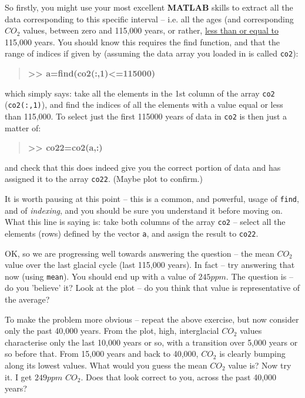 \documentclass{tufte-book} %
\newenvironment{docspecbold}{\begin{quotation}\ttfamily\bfseries\parskip0pt\parindent0pt\ignorespaces}{\end{quotation}}
\begin{document}
So firstly, you might use your most excellent \textbf{MATLAB} skills to extract all the data corresponding to this specific interval -- i.e. all the ages (and corresponding \(CO_{2}\) values, between zero and 115,000 years, or rather, \uline{less than or equal to} 115,000 years. You should know this requires the find function, and that the range of indices if given by (assuming the data array you loaded in is called \texttt{co2}):
\begin{docspecbold}
>> a=find(co2(:,1)<=115000)
\end{docspecbold}
which simply says: take all the elements in the 1st column of the array \texttt{co2} (\texttt{co2(:,1)}), and find the indices of all the elements with a value equal or less than 115,000. To select just the first 115000 years of data in \texttt{co2} is then just a matter of: 
\begin{docspecbold}
>> co22=co2(a,:)
\end{docspecbold}
and check that this does indeed give you the correct portion of data and has assigned it to the array \texttt{co22}.
(Maybe plot to confirm.)

It is worth pausing at this point -- this is a common, and powerful, usage of \texttt{find}, and of \textit{indexing}, and you should be sure you understand it before moving on. What this line is saying is: take both columns of the array \texttt{co2} -- select all the elements (rows) defined by the vector \texttt{a}, and assign the result to \texttt{co22}.

OK, so we are progressing well towards answering the question -- the mean \(CO_{2}\) value over the last glacial cycle (last 115,000 years). In fact -- try answering that now (using \texttt{mean}). You should end up with a value of \(245 ppm\). The question is -- do you 'believe' it? Look at the plot -- do you think that value is representative of the average?

To make the problem more obvious -- repeat the above exercise, but now consider only the past 40,000 years. From the plot, high, interglacial \(CO_{2}\) values characterise only the last 10,000 years or so, with a transition over 5,000 years or so before that. From 15,000 years and back to 40,000, \(CO_{2}\) is clearly bumping along its lowest values. What would you guess the mean \(CO_{2}\) value is? Now try it. I get \(249 ppm\) \(CO_{2}\). Does that look correct to you, across the past 40,000 years?
\end{document}

